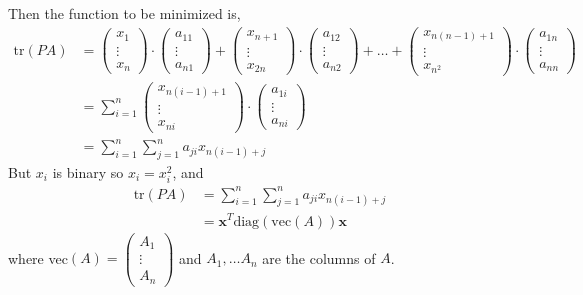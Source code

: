 \documentclass{article}
\begin{document}
\noindent Then the function to be minimized is,
\begin{align*}
    \text{tr} (PA) &= \begin{pmatrix}
        x_1 \\
        \vdots \\
        x_n
    \end{pmatrix} \cdot \begin{pmatrix}
        a_{11}\\
        \vdots \\
        a_{n1}
    \end{pmatrix} + \begin{pmatrix}
        x_{n+1} \\
        \vdots \\
        x_{2n}
    \end{pmatrix} \cdot \begin{pmatrix}
        a_{12}\\
        \vdots \\
        a_{n2}
    \end{pmatrix} + \hdots + \begin{pmatrix}
        x_{n(n-1) + 1} \\
        \vdots \\
        x_{n^2}
    \end{pmatrix} \cdot \begin{pmatrix}
        a_{1n}\\
        \vdots \\
        a_{nn}
    \end{pmatrix} \\
    &= \sum_{i=1}^{n} \begin{pmatrix}
        x_{n(i-1) + 1} \\
        \vdots \\
        x_{ni}
    \end{pmatrix} \cdot \begin{pmatrix}
        a_{1i} \\
        \vdots \\
        a_{ni}
    \end{pmatrix} \\
    &= \sum_{i=1}^{n} \sum_{j=1}^{n} a_{ji}x_{n(i-1)+j}
\end{align*}
But \(x_i\) is binary so \(x_i = x_i^2\), and 
\begin{align*}
    \text{tr}(PA) &= \sum_{i=1}^{n} \sum_{j=1}^{n} a_{ji}x_{n(i-1)+j} \\
    &= \mathbf{x}^T \text{diag}(\text{vec}(A))\mathbf{x}
\end{align*}
where vec\((A) = \begin{pmatrix}
    A_1 \\
    \vdots \\
    A_n
\end{pmatrix}\) and \(A_1, \dots A_n\) are the columns of \(A\).\\
\end{document}
